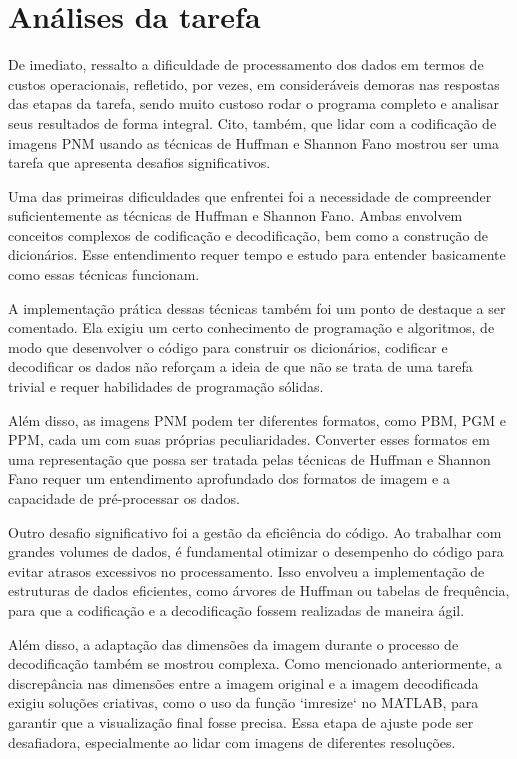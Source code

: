 \documentclass{article}
\begin{document}
\section{Análises da tarefa}

De imediato, ressalto a dificuldade de processamento dos dados em termos de custos operacionais, refletido, por vezes, em consideráveis demoras nas respostas das etapas da tarefa, sendo muito custoso rodar o programa completo e analisar seus resultados de forma integral. Cito, também, que lidar com a codificação de imagens PNM usando as técnicas de Huffman e Shannon Fano mostrou ser uma tarefa que apresenta desafios significativos. 

Uma das primeiras dificuldades que enfrentei foi a necessidade de compreender suficientemente as técnicas de Huffman e Shannon Fano. Ambas envolvem conceitos complexos de codificação e decodificação, bem como a construção de dicionários. Esse entendimento requer tempo e estudo para entender basicamente como essas técnicas funcionam.

A implementação prática dessas técnicas também foi um ponto de destaque a ser comentado. Ela exigiu um certo conhecimento de programação e algoritmos, de modo que desenvolver o código para construir os dicionários, codificar e decodificar os dados não reforçam a ideia de que não se trata de uma tarefa trivial e requer habilidades de programação sólidas.

Além disso, as imagens PNM podem ter diferentes formatos, como PBM, PGM e PPM, cada um com suas próprias peculiaridades. Converter esses formatos em uma representação que possa ser tratada pelas técnicas de Huffman e Shannon Fano requer um entendimento aprofundado dos formatos de imagem e a capacidade de pré-processar os dados.

Outro desafio significativo foi a gestão da eficiência do código. Ao trabalhar com grandes volumes de dados, é fundamental otimizar o desempenho do código para evitar atrasos excessivos no processamento. Isso envolveu a implementação de estruturas de dados eficientes, como árvores de Huffman ou tabelas de frequência, para que a codificação e a decodificação fossem realizadas de maneira ágil.

Além disso, a adaptação das dimensões da imagem durante o processo de decodificação também se mostrou complexa. Como mencionado anteriormente, a discrepância nas dimensões entre a imagem original e a imagem decodificada exigiu soluções criativas, como o uso da função `imresize` no MATLAB, para garantir que a visualização final fosse precisa. Essa etapa de ajuste pode ser desafiadora, especialmente ao lidar com imagens de diferentes resoluções.
\end{document}
